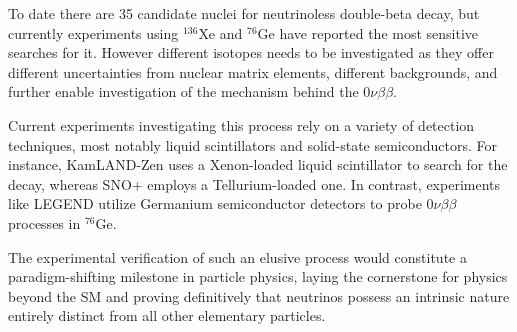 To date there are 35 candidate nuclei for neutrinoless double-beta decay, but currently experiments using ${}^{136}$Xe and ${}^{76}$Ge have reported the most sensitive searches for it. However different isotopes needs to be investigated as they offer different uncertainties from
nuclear matrix elements, different backgrounds, and further enable investigation of the mechanism behind the $0\nu\beta\beta$. \cite{neutrinosPDG}

Current experiments investigating this process rely on a variety of detection techniques, most notably liquid scintillators and solid-state semiconductors. For instance, KamLAND-Zen uses a Xenon-loaded liquid scintillator to search for the decay, whereas SNO+ employs a Tellurium-loaded one. In contrast, experiments like LEGEND utilize Germanium semiconductor detectors to probe $0\nu\beta\beta$ processes in ${}^{76}$Ge.

The experimental verification of such an elusive process would constitute a paradigm-shifting milestone in particle physics, laying the cornerstone for physics beyond the \ac{SM} and proving definitively that neutrinos possess an intrinsic nature entirely distinct from all other elementary particles.